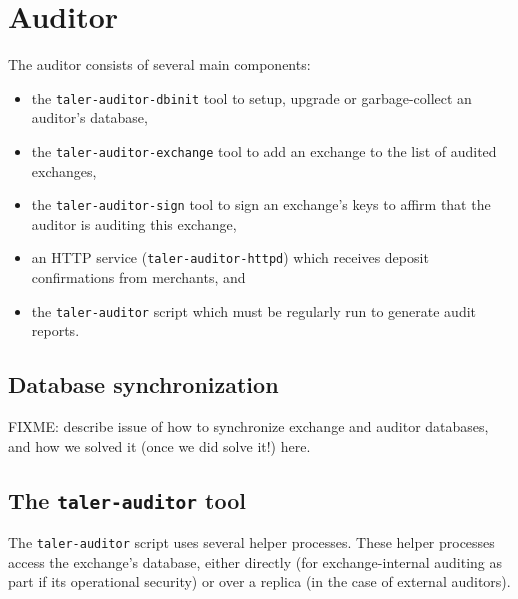 \section{Auditor}

The auditor consists of several main components:
\begin{itemize}
 \item the \texttt{taler-auditor-dbinit} tool to setup,
   upgrade or garbage-collect an auditor's database,
 \item the \texttt{taler-auditor-exchange} tool to add an
   exchange to the list of audited exchanges,
 \item the \texttt{taler-auditor-sign} tool to sign an exchange's
   keys to affirm that the auditor is auditing this exchange,
 \item an HTTP service (\texttt{taler-auditor-httpd}) which
   receives deposit confirmations from merchants, and
 \item the \texttt{taler-auditor} script which must be regularly
   run to generate audit reports.
\end{itemize}

\subsection{Database synchronization}

FIXME: describe issue of how to synchronize exchange and auditor
databases, and how we solved it (once we did solve it!) here.

\subsection{The \texttt{taler-auditor} tool}

The \texttt{taler-auditor} script uses several helper processes.  These helper
processes access the exchange's database, either directly (for
exchange-internal auditing as part if its operational security) or over a
replica (in the case of external auditors).

